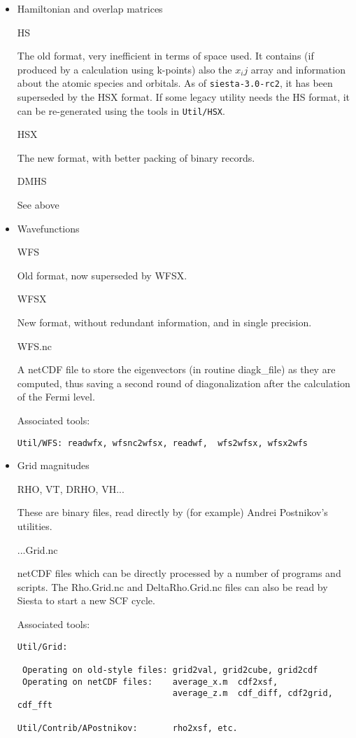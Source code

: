 \documentclass[11pt]{article}
\begin{document}
\begin{itemize}
\item{Hamiltonian and overlap matrices}

HS

The old format, very inefficient in terms of space used. It contains
(if produced by a calculation using k-points) also the $x_ij$ array
and information about the atomic species and orbitals. As of
{\tt siesta-3.0-rc2}, it has been superseded by the HSX format. If some
legacy utility needs the HS format, it can be re-generated using
the tools in {\tt Util/HSX}.

HSX

The new format, with better packing of binary records.

DMHS

See above

\item{Wavefunctions}

WFS

Old format, now superseded by WFSX.

WFSX

New format, without redundant information, and in single precision.

WFS.nc

A netCDF file to store the eigenvectors (in routine diagk\_file) as they
are computed, thus saving a second round of diagonalization after the
calculation of the Fermi level.

Associated tools:
\begin{verbatim}
Util/WFS: readwfx, wfsnc2wfsx, readwf,  wfs2wfsx, wfsx2wfs
\end{verbatim}

\item{Grid magnitudes}

RHO, VT, DRHO, VH...

These are binary files, read directly by (for example) Andrei
Postnikov's utilities.

...Grid.nc

netCDF files which can be directly processed by a number of programs
and scripts.  The Rho.Grid.nc and DeltaRho.Grid.nc files can also be
read by Siesta to start a new SCF cycle.

Associated tools:

\begin{verbatim}
Util/Grid:

 Operating on old-style files: grid2val, grid2cube, grid2cdf
 Operating on netCDF files:    average_x.m	cdf2xsf,
                               average_z.m  cdf_diff, cdf2grid, cdf_fft

Util/Contrib/APostnikov:       rho2xsf, etc.

\end{verbatim}
\end{itemize}
\end{document}
